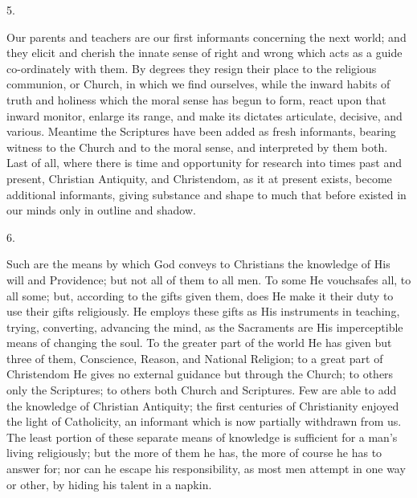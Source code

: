 5.

Our parents and teachers are our first informants concerning the
next world; and they elicit and cherish the innate sense of right and
wrong which acts as a guide co-ordinately with them. By degrees they
resign their place to the religious communion, or Church, in which we
find ourselves, while the inward habits of truth and holiness which
the moral sense has begun to form, react upon that inward monitor,
enlarge its range, and make its dictates articulate, decisive, and
various. Meantime the Scriptures have been added as fresh informants,
bearing witness to the Church and to the moral sense, and interpreted
by them both. Last of all, where there is time and opportunity for
research into times past and present, Christian Antiquity, and
Christendom, as it at present exists, become additional informants,
giving substance and shape to much that before existed in our minds
only in outline and shadow.

6.

Such are the means by which God conveys to Christians the knowledge
of His will and Providence; but not all of them to all men. To some He
vouchsafes all, to all some; but, according to the gifts given them,
does He make it their duty to use their gifts religiously. He employs
these gifts as His instruments in teaching, trying, converting,
advancing the mind, as the Sacraments are His imperceptible means of
changing the soul. To the greater part of the world He has given but
three of them, Conscience, Reason, and National Religion; to a great
part of Christendom He gives no external guidance but through the
Church; to others only the Scriptures; to others both Church and
Scriptures. Few are able to add the knowledge of Christian Antiquity;
the first centuries of Christianity enjoyed the light of Catholicity,
an informant which is now partially withdrawn from us. The least portion of these separate means of knowledge is sufficient for a man's
living religiously; but the more of them he has, the more of course he
has to answer for; nor can he escape his responsibility, as most men
attempt in one way or other, by hiding his talent in a napkin.

